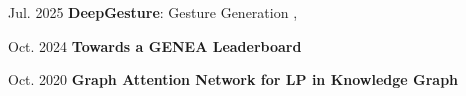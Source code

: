 \begin{samepage}
	
\begin{twocolentry}{Jul. 2025}
	\textbf{DeepGesture}: Gesture Generation , 
\end{twocolentry}

\vspace{0.10 cm}

\begin{twocolentry}{Oct. 2024}
	\textbf{Towards a GENEA Leaderboard} 
\end{twocolentry}

\vspace{0.10 cm}


\begin{twocolentry}{Oct. 2020}
	\textbf{Graph Attention Network for LP in Knowledge Graph} 
\end{twocolentry}
\end{samepage}
